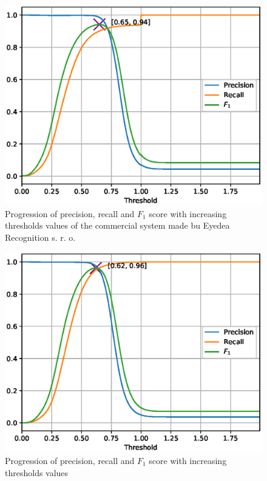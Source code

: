\begin{figure}[H]
    \centering
    \includegraphics{images/implementation/prft_eyedea.eps}
    \caption{Progression of precision, recall and $F_1$ score with increasing thresholds values of the commercial
    system made bu Eyedea Recognition s. r. o.}
    \label{fig:prft_eyedea}
\end{figure}

\begin{figure}[H]
    \centering
    \includegraphics{images/implementation/prft_fav-128_N1.eps}
    \caption{Progression of precision, recall and $F_1$ score with increasing thresholds values}
    \label{fig:prft}
\end{figure}
